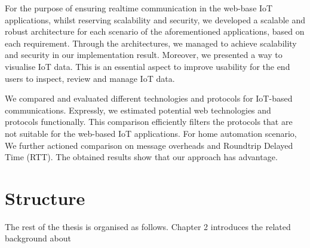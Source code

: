 For the purpose of ensuring realtime communication in the web-base IoT applications, whilst reserving scalability and security, we developed a scalable and robust architecture for each scenario of the aforementioned applications, based on each requirement. Through the architectures, we managed to achieve scalability and security in our implementation result. Moreover, we presented a way to visualise IoT data. This is an essential aspect to improve usability for the end users to inspect, review and manage IoT data.

We compared and evaluated different technologies and protocols for IoT-based communications. Expressly, we estimated potential web technologies and protocols functionally. This comparison efficiently filters the protocols that are not suitable for the web-based IoT applications. For home automation scenario, We further actioned comparison on message overheads and Roundtrip Delayed Time (RTT). The obtained results show that our approach has advantage.

\section{Structure}

The rest of the thesis is organised as follows. Chapter 2 introduces the related background about 